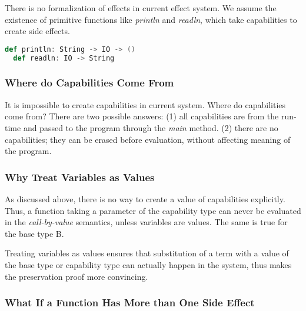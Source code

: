 There is no formalization of effects in current effect system. We
assume the existence of primitive functions like \emph{println} and
\emph{readln}, which take capabilities to create side effects.

\begin{lstlisting}[language=Scala]
  def println: String -> IO -> ()
  def readln: IO -> String
\end{lstlisting}



\subsubsection{Where do Capabilities Come From}

It is impossible to create capabilities in current system. Where do
capabilities come from?  There are two possible answers: (1) all
capabilities are from the run-time and passed to the program through
the \emph{main} method. (2) there are no capabilities; they can be
erased before evaluation, without affecting meaning of the program.


\subsubsection{Why Treat Variables as Values}

As discussed above, there is no way to create a value of capabilities
explicitly. Thus, a function taking a parameter of the capability type
can never be evaluated in the \emph{call-by-value} semantics, unless
variables are values. The same is true for the base type B.

Treating variables as values ensures that substitution of a term with
a value of the base type or capability type can actually happen in the
system, thus makes the preservation proof more convincing.


\subsubsection{What If a Function Has More than One Side Effect}

